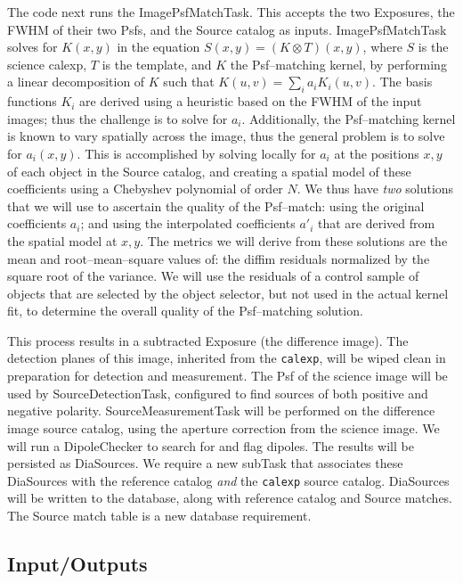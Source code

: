 \documentclass[12pt]{article}
\begin{document}
The code next runs the ImagePsfMatchTask.  This accepts the two
Exposures, the FWHM of their two Psfs, and the Source catalog as
inputs.  ImagePsfMatchTask solves for $K(x,y)$ in the
equation $S(x,y) = (K \otimes T)(x,y)$, where $S$ is the science
calexp, $T$ is the template, and $K$ the Psf--matching kernel, by
performing a linear decomposition of $K$ such that $K(u,v) = \sum_i
a_i K_i(u,v)$.  The basis functions $K_i$ are derived using a
heuristic based on the FWHM of the input images; thus the challenge is to solve for $a_i$.
Additionally, the Psf--matching kernel is known to vary spatially
across the image, thus the general problem is to solve for $a_i(x,y)$.
This is accomplished by solving locally for $a_i$ at the positions
$x,y$ of each object in the Source catalog, and creating a spatial
model of these coefficients using a Chebyshev polynomial of order $N$.
We thus have {\it two} solutions that we will use to ascertain the
quality of the Psf--match: using the original coefficients $a_i$; and
using the interpolated coefficients $a{'}_i$ that are derived from the
spatial model at $x,y$.  The metrics we will derive from these
solutions are the mean and root--mean--square values of: the diffim
residuals normalized by the square root of the variance.  We will use
the residuals of a control sample of objects that are selected by the
object selector, but not used in the actual kernel fit, to determine
the overall quality of the Psf--matching solution.

This process results in a subtracted Exposure (the difference image).
The detection planes of this image, inherited from the {\tt calexp},
will be wiped clean in preparation for detection and measurement.  The
Psf of the science image will be used by SourceDetectionTask,
configured to find sources of both positive and negative polarity.
SourceMeasurementTask will be performed on the difference image source
catalog, using the aperture correction from the science image.  We
will run a DipoleChecker to search for and flag
dipoles.  The results will be persisted as DiaSources.  We require a
new subTask that associates these DiaSources with the reference
catalog {\it and} the {\tt calexp} source catalog.  DiaSources will be written to the database,
along with reference catalog and Source matches.  The Source match
table is a new database requirement.

\subsection{Input/Outputs}
\end{document}
